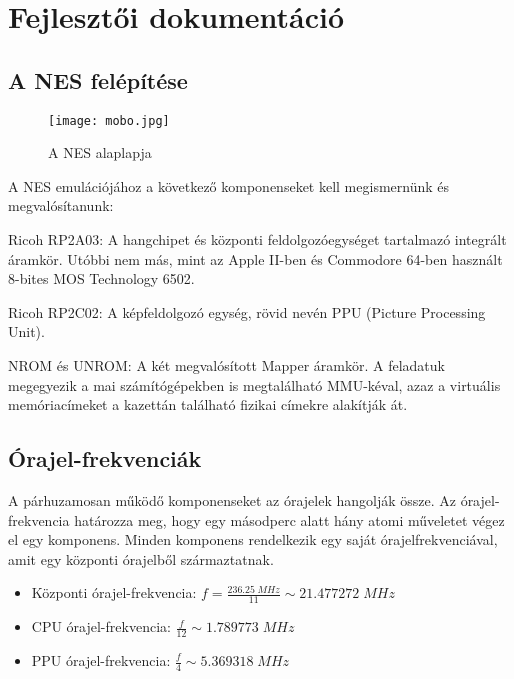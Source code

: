 \chapter{Fejlesztői dokumentáció} %
\label{ch:impl}

\section{A NES felépítése}

\begin{figure}[H]
	\centering
	\texttt{[image: mobo.jpg]}
	\caption{A NES alaplapja}
\end{figure}

A NES emulációjához a következő komponenseket kell megismernünk és megvalósítanunk:

\begin{compactdesc}
	\item[Ricoh RP2A03:] A hangchipet és központi feldolgozóegységet tartalmazó integrált áramkör. Utóbbi nem más, mint az Apple II-ben és Commodore 64-ben használt 8-bites MOS Technology 6502.
	\item[Ricoh RP2C02:] A képfeldolgozó egység, rövid nevén PPU (Picture Processing Unit).
	\item[NROM és UNROM:] 
	A két megvalósított Mapper áramkör.
	A feladatuk megegyezik a mai számítógépekben is megtalálható MMU-kéval, azaz a virtuális memóriacímeket a kazettán található fizikai címekre alakítják át.
\end{compactdesc}

\section{Órajel-frekvenciák}
A párhuzamosan működő komponenseket az órajelek hangolják össze. Az órajel-frekvencia határozza meg, hogy egy másodperc alatt hány atomi műveletet végez el egy komponens.
Minden komponens rendelkezik egy saját órajelfrekvenciával, amit egy központi órajelből származtatnak.

\begin{itemize}
	\item Központi órajel-frekvencia: $ f = \frac{236.25\;MHz}{11} \sim 21.477272\; MHz $
	\item CPU órajel-frekvencia: $ \frac{f}{12} \sim 1.789773 \; MHz  $
	\item PPU órajel-frekvencia: $ \frac{f}{4}  \sim 5.369318 \; MHz $
\end{itemize}

